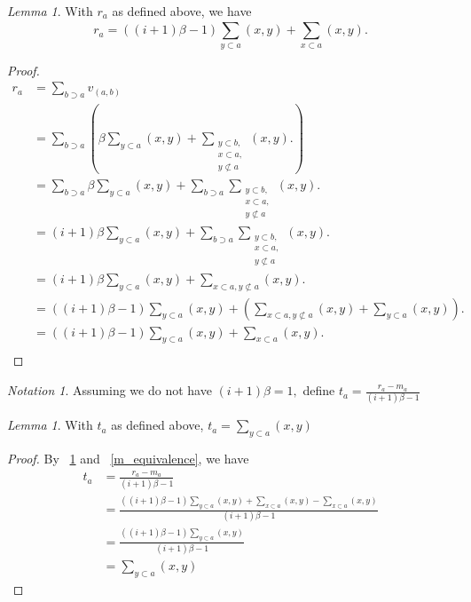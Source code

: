\documentclass[10 pt]{amsart}
\theoremstyle{plain}
\theoremstyle{definition}
\theoremstyle{remark}
\numberwithin{equation}{section}
\newtheorem{lem}[thm]{Lemma}
\theoremstyle{remark}
\newtheorem{note}[thm]{Notation}
\begin{document}
\begin{lem}
\label{r_equivalence}
With $r_a$ as defined above, we have 
$$r_a = ((i+1)\beta-1)\sum_{y\subset a}^{}(x, y) +\sum_{x\subset a}^{}(x,y).$$
\end{lem}
\begin{proof}
\begin{align*}
	r_a &= \sum_{b\supset a}^{}v_{(a, b)}\\
	&=\sum_{b\supset a}^{} \left(\beta \sum_{y \subset a}^{}(x, y) + \sum_{\substack{{y\subset b,}\\{x \subset a,}\\{y\not\subset a}}}^{}(x, y).\right)\\
	&= \sum_{b\supset a}^{} \beta \sum_{y \subset a}^{}(x, y) + \sum_{b\supset a}^{} \sum_{\substack{{y\subset b,}\\{x \subset a,}\\{y\not\subset a}}}^{}(x, y).\\
	&= (i+1)\beta \sum_{y \subset a}^{}(x, y) + \sum_{b\supset a}^{} \sum_{\substack{{y\subset b,}\\{x \subset a,}\\{y\not\subset a}}}^{}(x, y).\\
	&= (i+1)\beta \sum_{y \subset a}^{}(x, y) + \sum_{x \subset a,y\not\subset a}^{}(x, y).\\
	&= ((i+1)\beta-1) \sum_{y \subset a}^{}(x, y) + \left( \sum_{x \subset a,y\not\subset a}^{}(x, y)+\sum_{y \subset a}^{}(x, y)\right).\\
	&= ((i+1)\beta-1) \sum_{y \subset a}^{}(x, y) + \sum_{x \subset a}^{}(x, y).\\
\end{align*}
\end{proof}
\begin{note}
Assuming we do not have $(i+1)\beta = 1,$ define $t_a = \frac{r_a - m_a}{(i+1)\beta - 1}$
\end{note}

\begin{lem}
\label{t_equivalence}
With $t_a$ as defined above, $t_a= \sum_{y\subset a}^{}(x, y) $
\end{lem}
\begin{proof}
By ~\ref{r_equivalence} and ~\ref{m_equivalence}, we have
\begin{align*}
	t_a &= \frac{r_a - m_a}{(i+1)\beta - 1}\\
	&= \frac{((i+1)\beta-1)\sum_{y\subset a}^{}(x, y) +\sum_{x\subset a}^{}(x, y)-\sum_{x\subset a}^{}(x, y) }{(i+1)\beta - 1}\\
	&= \frac{((i+1)\beta-1)\sum_{y\subset a}^{}(x, y)}{(i+1)\beta - 1}\\
	&= \sum_{y\subset a}^{}(x, y)
\end{align*}
\end{proof}
\end{document}
